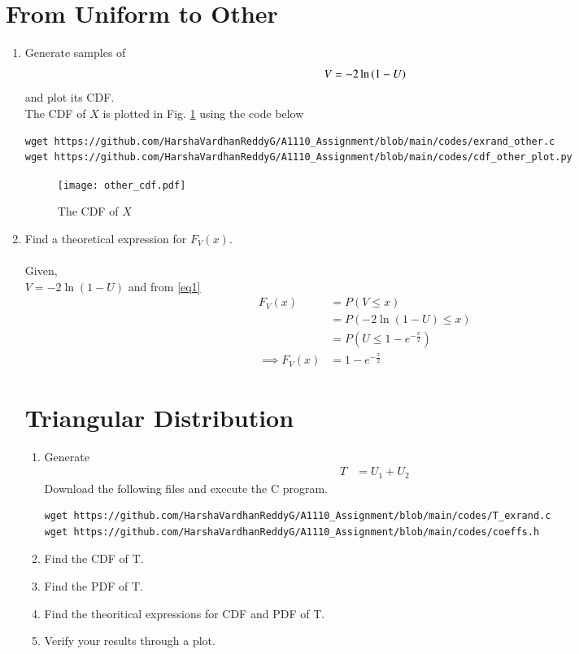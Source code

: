 \documentclass[journal,12pt,twocolumn]{IEEEtran}
\renewcommand\thesection{\arabic{section}}
\begin{document}
\section{From Uniform to Other}
\begin{enumerate}[label=\thesection.\arabic*
,ref=\thesection.\theenumi]
\item Generate samples of 
%
\begin{equation}
V = -2\ln\left(1-U\right)
\end{equation}
%
and plot its CDF. \\
\solution
The CDF of $X$ is plotted in Fig. \ref{fig:other_cdf} using the code below
\begin{lstlisting}
wget https://github.com/HarshaVardhanReddyG/A1110_Assignment/blob/main/codes/exrand_other.c
wget https://github.com/HarshaVardhanReddyG/A1110_Assignment/blob/main/codes/cdf_other_plot.py
\end{lstlisting}
\begin{figure}[ht!]
\centering
\texttt{[image: other\_cdf.pdf]}
\caption{The CDF of $X$}
\centering
\label{fig:other_cdf}
\end{figure}
    \item Find a theoretical expression for $F_V(x)$.\\
    \solution\\
    Given,\\
    $V=-2\ln{(1-U)}$
    and from \eqref{eq1}
    \begin{align}
        F_V(x)&=P(V\leq x)\\
        &=P(-2\ln{(1-U)} \leq x)\\
        &=P\left(U \leq 1-e^{-\frac{x}{2}}\right)\\
        \implies F_V(x)&=1-e^{-\frac{x}{2}}
    \end{align}
\section{Triangular Distribution}
\begin{enumerate}[label=\thesection.\arabic*
,ref=\thesection.\theenumi]
\item Generate 
\begin{align}
    T&=U_1 + U_2
\end{align}
\solution Download the following files and execute the  C program.
\begin{lstlisting}
wget https://github.com/HarshaVardhanReddyG/A1110_Assignment/blob/main/codes/T_exrand.c
wget https://github.com/HarshaVardhanReddyG/A1110_Assignment/blob/main/codes/coeffs.h
\end{lstlisting}

\item Find the CDF of T.\\
\solution

\item Find the PDF of T.
\item Find the theoritical expressions for CDF and PDF of T.
\item Verify your results through a plot.
\end{enumerate}

\end{enumerate}
\end{document}
